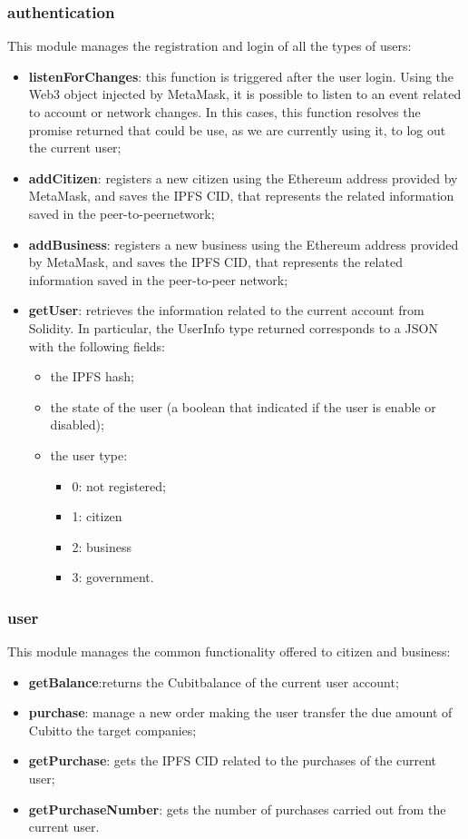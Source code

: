 \subsubsection{authentication\glo}
This module manages the registration and login of all the types of users:
\begin{itemize}
	\item \textbf{listenForChanges}: this function is triggered after the user login. Using the Web3 object injected by MetaMask\glo, it is possible to listen to an event related to account or network changes. In this cases, this function resolves the promise returned that could be use, as we are currently using it, to log out the current user;
	\item \textbf{addCitizen}: registers a new citizen using the Ethereum address provided by MetaMask, and saves the IPFS CID, that represents the related information saved in the peer-to-peer\glosp network;
	\item \textbf{addBusiness}: registers a new business using the Ethereum address provided by MetaMask, and saves the IPFS CID, that represents the related information saved in the peer-to-peer network;
	\item \textbf{getUser}: retrieves the information related to the current account from Solidity. In particular, the UserInfo type returned corresponds to a JSON with the following fields:
	\begin{itemize}
		\item the IPFS hash;
		\item the state of the user (a boolean that indicated if the user is enable or disabled);
		\item the user type:
		\begin{itemize}
			\item 0: not registered;
			\item 1: citizen
			\item 2: business
			\item 3: government.
		\end{itemize}
	\end{itemize}
\end{itemize}
\subsubsection{user}
This module manages the common functionality offered to citizen and business:
\begin{itemize}
	\item \textbf{getBalance}:returns the Cubit\glosp balance of the current user account;
	\item \textbf{purchase}: manage a new order making the user transfer the due amount of Cubit\glosp to the target companies;
	\item \textbf{getPurchase}: gets the IPFS CID related to the purchases of the current user;
	\item \textbf{getPurchaseNumber}: gets the number of purchases carried out from the current user.
\end{itemize}
